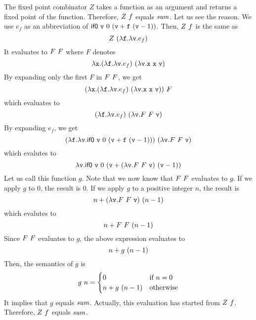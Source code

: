The fixed point combinator $Z$ takes a function as an argument and returns a
fixed point of the function. Therefore, $Z\ f$ equals $\mbox{\emph{sum}}$. Let
us see the reason. We use $e_f$ as an abbreviation of $\textsf{if0}\ \texttt{v}\ 0\ (\texttt{v}+\texttt{f}\ (\texttt{v}-1))$.
Then, $Z\ f$ is the same as
\[ Z\ (\lambda\texttt{f}.\lambda\texttt{v}.e_f) \]
It evaluates to $F\ F$ where $F$ denotes
\[
  \lambda\texttt{x}.(\lambda\texttt{f}.\lambda\texttt{v}.e_f)\ (\lambda\texttt{v}.\texttt{x}\ \texttt{x}\ \texttt{v})
\]
By expanding only the first $F$ in $F\ F$, we get
\[
  (\lambda\texttt{x}.(\lambda\texttt{f}.\lambda\texttt{v}.e_f)\ (\lambda\texttt{v}.\texttt{x}\ \texttt{x}\ \texttt{v}))\ F
\]
which evaluates to
\[
  (\lambda\texttt{f}.\lambda\texttt{v}.e_f)\ (\lambda\texttt{v}.F\ F\ \texttt{v})
\]
By expanding $e_f$, we get
\[
  (\lambda\texttt{f}.\lambda\texttt{v}.\textsf{if0}\ \texttt{v}\ 0\ (\texttt{v}+\texttt{f}\ (\texttt{v}-1)))\ (\lambda\texttt{v}.F\ F\ \texttt{v})
\]
which evalutes to
\[
  \lambda\texttt{v}.{\textsf{if0}\ \texttt{v}\ 0\ (\texttt{v}+(\lambda\texttt{v}.F\ F\ \texttt{v})\ (\texttt{v}-1))}
\]
Let us call this function $g$. Note that we now know that $F\ F$
evaluates to $g$. If we apply $g$ to
$0$, the result is $0$. If we apply $g$ to a positive integer $n$, the result is
\[
  n+(\lambda\texttt{v}.F\ F\ \texttt{v})\ (n-1)
\]
which evalutes to
\[
  n+F\ F\ (n-1)
\]
Since ${F\ F}$ evaluates to $g$, the above expression evaluates to
\[
  n+g\ (n-1)
\]
Then, the semantics of $g$ is
\[
  g\ n=\begin{cases}
    0 & \text{if } n=0\\
    n+g\ (n-1) & \text{otherwise}
  \end{cases}
\]
It implies that $g$ equals $\mbox{\emph{sum}}$. Actually, this evaluation has started from
$Z\ f$. Therefore, $Z\ f$ equals $\mbox{\emph{sum}}$.

